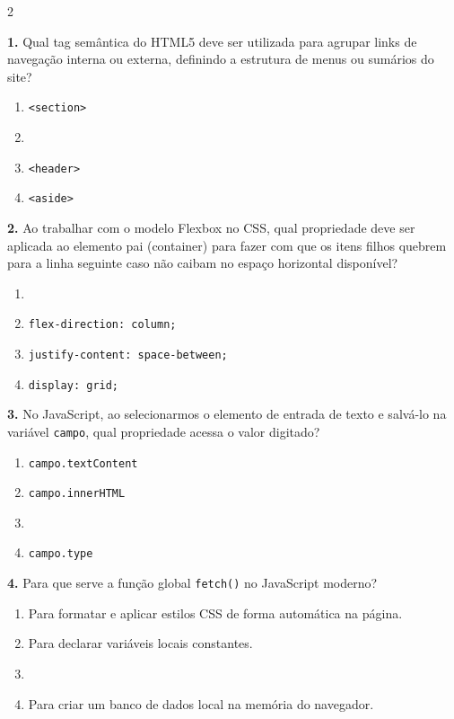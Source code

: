\documentclass[12pt,a4paper]{article}
\newcommand{\correto}[1]{\iftoggle{gabarito}{\textcolor{corGabarito}{\textbf{#1}}}{#1}}
\begin{document}
\begin{multicols}{2}

\textbf{1.} Qual tag semântica do HTML5 deve ser utilizada para agrupar links de navegação interna ou externa, definindo a estrutura de menus ou sumários do site?
\begin{enumerate}[label=(\alph*)]
    \item \texttt{<section>}
    \item \correto{\texttt{<nav>}}
    \item \texttt{<header>}
    \item \texttt{<aside>}
\end{enumerate}

\vspace{0.2cm}
\textbf{2.} Ao trabalhar com o modelo Flexbox no CSS, qual propriedade deve ser aplicada ao elemento pai (container) para fazer com que os itens filhos quebrem para a linha seguinte caso não caibam no espaço horizontal disponível?
\begin{enumerate}[label=(\alph*)]
    \item \correto{\texttt{flex-wrap: wrap;}}
    \item \texttt{flex-direction: column;}
    \item \texttt{justify-content: space-between;}
    \item \texttt{display: grid;}
\end{enumerate}

\vspace{0.2cm}
\textbf{3.} No JavaScript, ao selecionarmos o elemento de entrada de texto e salvá-lo na variável \texttt{campo}, qual propriedade acessa o valor digitado?
\begin{enumerate}[label=(\alph*)]
    \item \texttt{campo.textContent}
    \item \texttt{campo.innerHTML}
    \item \correto{\texttt{campo.value}}
    \item \texttt{campo.type}
\end{enumerate}

\vspace{0.2cm}
\textbf{4.} Para que serve a função global \texttt{fetch()} no JavaScript moderno?
\begin{enumerate}[label=(\alph*)]
    \item Para formatar e aplicar estilos CSS de forma automática na página.
    \item Para declarar variáveis locais constantes.
    \item \correto{Para realizar requisições HTTP assíncronas sem recarregar a página.}
    \item Para criar um banco de dados local na memória do navegador.
\end{enumerate}


\end{multicols}
\end{document}
